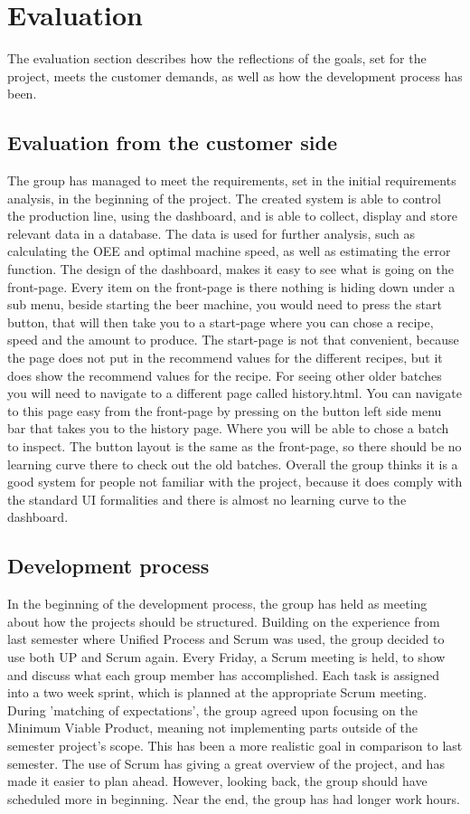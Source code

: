 \section{Evaluation}
The evaluation section describes how the reflections of the goals, set for the
project, meets the customer demands, as well as how the development process has
been.


\subsection{Evaluation from the customer side}
The group has managed to meet the requirements, set in the initial requirements
analysis, in the beginning of the project. The created system is able to control
the production line, using the dashboard, and is able to collect, display and
store relevant data in a database. The data is used for further analysis, such
as calculating the OEE and optimal machine speed, as well as estimating the
error function.
The design of the dashboard, makes it easy to see what is going on the front-page.
Every item on the front-page is there nothing is hiding down under a sub menu,
beside starting the beer machine, you would need to press the start button,
that will then take you to a start-page where you can chose a recipe, speed and 
the amount to produce. The start-page is not that convenient, because the page 
does not put in the recommend values for the different recipes, but it does
show the recommend values for the recipe.
For seeing other older batches you will need to navigate to a different page
called history.html. You can navigate to this page easy from the front-page by
pressing on the button left side menu bar that takes you to the history page.
Where you will be able to chose a batch to inspect.
The button layout is the same as the front-page, so there should be no learning
curve there to check out the old batches.
Overall the group thinks it is a good system for people not familiar with the
project, because it does comply with the standard UI formalities and there is
almost no learning curve to the dashboard.


\subsection{Development process}
In the beginning of the development process, the group has held as meeting
about how the projects should be structured. Building on the experience from
last semester where Unified Process and Scrum was used, the group
decided to use both UP and Scrum again. Every Friday, a Scrum meeting is held,
to show and discuss what each group member has accomplished. Each task is
assigned into a two week sprint, which is planned at the appropriate Scrum
meeting.
During 'matching of expectations', the group agreed upon focusing on the Minimum
Viable Product, meaning not implementing parts outside of the semester project's
scope. This has been a more realistic goal in comparison to last semester.
The use of Scrum has giving a great overview of the project, and has made it 
easier to plan ahead. However, looking back, the group should have scheduled 
more in beginning. Near the end, the group has had longer work hours.

